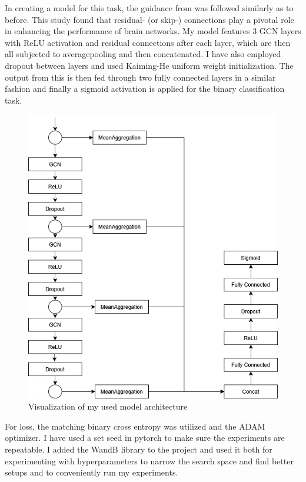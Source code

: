 	In creating a model for this task, the guidance from \cite{said2023neurograph} was followed similarly as to before. This study found that residual- (or skip-) connections play a pivotal role in enhancing the performance of brain networks. My model features 3 GCN layers with ReLU activation and residual connections after each layer, which are then all subjected to averagepooling and then concatenated. I have also employed dropout between layers and used Kaiming-He uniform weight initialization\cite{he2015delving}. The output from this is then fed through two fully connected layers in a similar fashion and finally a sigmoid activation is applied for the binary classification task. 
	
	\begin{figure}[!h]
		\centering
		\label{fig:model}
		\includegraphics[width=\textwidth]{figures/model.png}
		\caption{Visualization of my used model architecture}
	\end{figure}
	
	For loss, the matching binary cross entropy was utilized and the ADAM optimizer\cite{kingma2014adam}. I have used a set seed in pytorch to make sure the experiments are repeatable. I added the WandB library to the project and used it both for experimenting with hyperparameters to narrow the search space and find better setups and to conveniently run my experiments.
	
